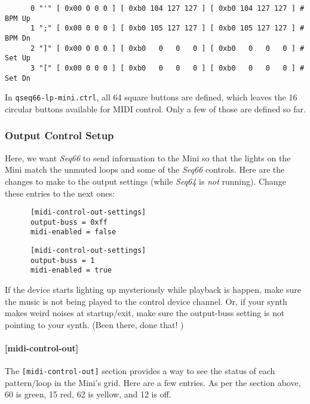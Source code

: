    \begin{verbatim}
      0 "'" [ 0x00 0 0 0 ] [ 0xb0 104 127 127 ] [ 0xb0 104 127 127 ] # BPM Up
      1 ";" [ 0x00 0 0 0 ] [ 0xb0 105 127 127 ] [ 0xb0 105 127 127 ] # BPM Dn
      2 "]" [ 0x00 0 0 0 ] [ 0xb0   0   0   0 ] [ 0xb0   0   0   0 ] # Set Up
      3 "[" [ 0x00 0 0 0 ] [ 0xb0   0   0   0 ] [ 0xb0   0   0   0 ] # Set Dn
   \end{verbatim}

   In \texttt{qseq66-lp-mini.ctrl}, all 64 square buttons are defined, which
   leaves the 16 circular buttons available for MIDI control. Only a few of those
   are defined so far.

\subsubsection{Output Control Setup}
\label{subsubsec:launchpad_mini_output_control_setup}

   Here, we want \textsl{Seq66} to send information to the Mini
   so that the lights on the Mini match the unmuted loops and 
   some of the \textsl{Seq66} controls.  Here are the changes to make to the
   output settings (while \textsl{Seq64} is \textsl{not} running).
   Change these entries to the next ones:

   \begin{verbatim}
      [midi-control-out-settings]
      output-buss = 0xff
      midi-enabled = false
   \end{verbatim}

   \begin{verbatim}
      [midi-control-out-settings]
      output-buss = 1
      midi-enabled = true
   \end{verbatim}

   If the device starts lighting up mysteriously while playback is happen, make
   sure the music is not being played to the control device channel.
   Or, if your synth makes weird noises at startup/exit, make
   sure the output-buss setting is not pointing to your synth.
   (Been there, done that! \smiley{})

\paragraph{[midi-control-out]}
\label{paragraph:patterns_midi_control_out}

   The \texttt{[midi-control-out]} section provides a way to see the status of
   each pattern/loop in the Mini's grid.  Here are a few entries. As per the
   section above, 60 is green, 15 red, 62 is yellow, and 12 is off.

